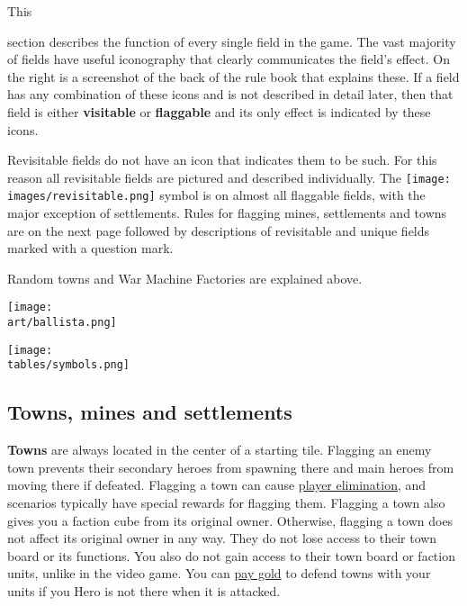 
\begin{multicols*}{2}

\hypertarget{All}{This} section describes the function of every single field in the game.
The vast majority of fields have useful iconography that clearly communicates the field's effect.
On the right is a screenshot of the back of the rule book that explains these.
If a field has any combination of these icons and is not described in detail later, then that field is either \textbf{visitable} or \textbf{flaggable} and its only effect is indicated by these icons.\par
Revisitable fields do not have an icon that indicates them to be such.
For this reason all revisitable fields are pictured and described individually.
The \texttt{[image: \\images/revisitable.png]} symbol is on almost all flaggable fields, with the major exception of settlements.
Rules for flagging mines, settlements and towns are on the next page followed by descriptions of revisitable and unique fields marked with a question mark.\par
Random towns and War Machine Factories are explained above.

\vfill
\begin{center}
  \hspace{-14em}
  \texttt{[image: \\art/ballista.png]}
\end{center}

\begin{center}
  \texttt{[image: \\tables/symbols.png]}
\end{center}

\clearpage
\subsection*{Towns, mines and settlements}
\textbf{Towns} are always located in the center of a starting tile.
Flagging an enemy town prevents their secondary heroes from spawning there and main heroes from moving there if defeated.
Flagging a town can cause \hyperlink{End}{player elimination}, and scenarios typically have special rewards for flagging them.
Flagging a town also gives you a faction cube from its original owner.
Otherwise, flagging a town does not affect its original owner in any way.
They do not lose access to their town board or its functions.
You also do not gain access to their town board or faction units, unlike in the video game.
You can \hyperlink{Town}{pay gold} to defend towns with your units if you Hero is not there when it is attacked.


\end{multicols*}
